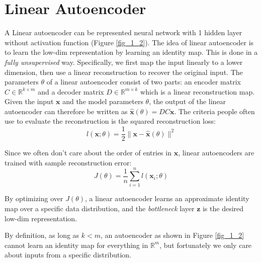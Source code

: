 \documentclass[../main.tex]{subfiles}
\begin{document}
\section{Linear Autoencoder}
A Linear autoencoder can be represented neural network with 1 hidden layer without activation function (Figure \ref{fig_1_2}). The idea of linear autoencoder is to learn the low-dim representation by learning an identity map. This is done in a \emph{fully unsupervised} way. Specifically, we first map the input linearly to a lower dimension, then use a linear reconstruction to recover the original input. The parameters $\theta$ of a linear autoencoder consist of two parts: an encoder matrix $C\in \mathbb{R}^{k\times m}$ and a decoder matrix $D\in \mathbb{R}^{m\times k}$ which is a linear reconstruction map. Given the input $\bm{x}$ and the model parameters $\theta$, the output of the linear autoencoder can therefore be written as $\hat{\bm{x}}(\theta)=DC\bm{x}$. The criteria people often use to evaluate the reconstruction is the squared reconstruction loss:
\begin{equation*}
l(\bm{x};\theta)=\frac{1}{2}\|\bm{x}-\hat{\bm{x}}(\theta)\|^2
\end{equation*}
\par Since we often don't care about the order of entries in $\bm{x}$, linear autoencoders are trained with sample reconstruction error:
\begin{equation*}
J(\theta)=\frac{1}{n}\sum_{i=1}^{n}l(\bm{x}_i;\theta)
\end{equation*}
\par By optimizing over $J(\theta)$, a linear autoencoder learns an approximate identity map over a specific data distribution, and the \emph{bottleneck} layer $\bm{z}$ is the desired low-dim representation.

\begin{remark}
	By definition, as long as $k<m$, an autoencoder as shown in Figure \ref{fig_1_2} cannot learn an identity map for everything in $\mathbb{R}^m$, but fortunately we only care about inputs from a specific distribution. 
\end{remark}
\end{document}
